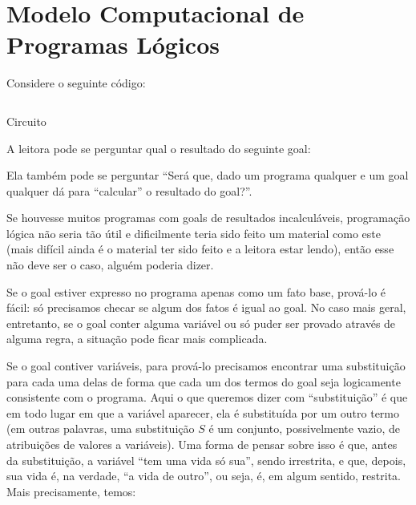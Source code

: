 
%


%
\section{Modelo Computacional de Programas Lógicos}

Considere o seguinte código:

    \begin{listing}
\inputminted{prolog}{../Exemplos/Cap1/prog1_circuito.pl}\label{lst:circuit}
\caption{Circuito}
    \end{listing}

A leitora pode se perguntar qual o resultado do seguinte goal:


 Ela também pode se perguntar ``Será que, dado um programa qualquer e um goal qualquer dá para ``calcular'' o resultado
 do goal?''.


Se houvesse muitos programas com goals de resultados incalculáveis,
programação lógica não seria tão útil e dificilmente teria sido feito
um material como este (mais difícil ainda é o material ter sido feito
e a leitora estar lendo), então esse não deve ser o caso, alguém
poderia dizer.

Se o goal estiver expresso no programa apenas como um fato base,
prová-lo é fácil: só precisamos checar se algum dos fatos é igual ao
goal. No caso mais geral, entretanto, se o goal conter alguma variável ou só puder
ser provado através de alguma regra, a situação pode ficar mais complicada.

Se o goal contiver variáveis, para prová-lo precisamos encontrar uma substituição para cada uma delas de forma
que cada um dos termos do goal seja logicamente consistente com o
programa. Aqui o que queremos dizer com ``substituição'' é que em todo
lugar em que a variável aparecer, ela é substituída por um outro termo
(em outras palavras, uma substituição $S$ é um conjunto, possivelmente
vazio, de atribuições de valores a variáveis). 
Uma forma de pensar sobre isso é que, antes da substituição, a variável ``tem uma vida só
sua'', sendo irrestrita, e que, depois, sua vida é, na verdade, ``a vida de
outro'', ou seja, é, em algum sentido, restrita. Mais precisamente, temos:\\

